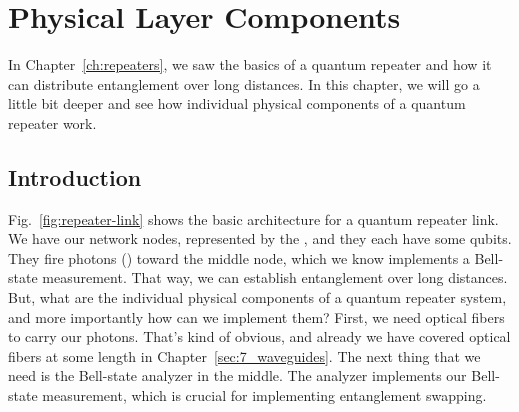 
\chapter{Physical Layer Components}

In Chapter~\ref{ch:repeaters}, we saw the basics of a quantum repeater and how it can distribute entanglement over long distances. In this chapter, we will go a little bit deeper and see how individual physical components of a quantum repeater work.

\section{Introduction}

Fig.~\ref{fig:repeater-link} shows the basic architecture for a quantum repeater link. We have our network nodes, represented by the , and they each have some qubits.  They fire photons () toward the middle node, which we know implements a Bell-state measurement. That way, we can establish entanglement over long distances. But, what are the individual physical components of a quantum repeater system, and more importantly how can we implement them? First, we need optical fibers to carry our photons. That's kind of obvious, and already we have covered optical fibers at some length in Chapter~\ref{sec:7_waveguides}. The next thing that we need is the Bell-state analyzer in the middle. The analyzer implements our Bell-state measurement, which is crucial for implementing entanglement swapping.

